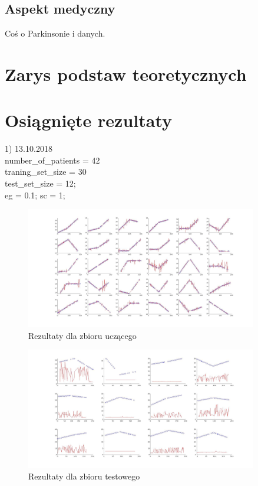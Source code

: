 \documentclass{article}
\begin{document}
\subsection{Aspekt medyczny}

Coś o Parkinsonie i danych.

\section{Zarys podstaw teoretycznych}

\section{Osiągnięte rezultaty}

1) 13.10.2018 \\


number\_of\_patients = 42\\
traning\_set\_size = 30\\
test\_set\_size = 12;\\

eg = 0.1; %
sc = 1;    %

\begin{figure}
\centering
	\includegraphics[width=0.90\textwidth]{fig1.jpg}\par\vspace{1cm}
\caption{Rezultaty dla zbioru uczącego}
	\label{fig:features}
\end{figure}

\begin{figure}
\centering
	\includegraphics[width=0.90\textwidth]{fig2.jpg}\par\vspace{1cm}
\caption{Rezultaty dla zbioru testowego}
	\label{fig:features}
\end{figure}
\end{document}
